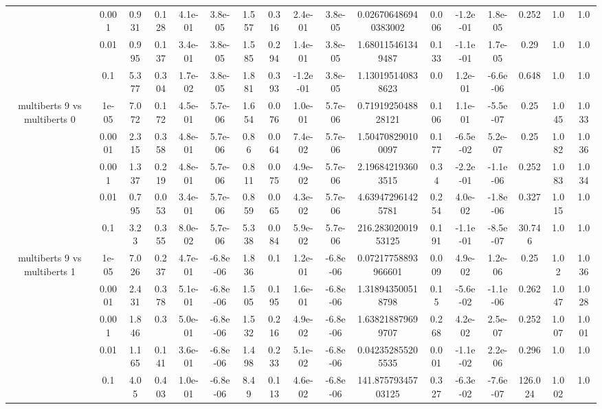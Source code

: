 \begin{tabular}{|c|c|c|c|c|c|c|c|c|c|c|c|c|c|c|c|c|}
 & 0.001 & 0.931 & 0.128 & 4.1e-01 & 3.8e-05 & 1.557 & 0.316 & 2.4e-01 & 3.8e-05 & 0.026706486940383002 & 0.006 & -1.2e-01 & 1.8e-05 & 0.252 & 1.0 & 1.0 \\
 & 0.01 & 0.995 & 0.137 & 3.4e-01 & 3.8e-05 & 1.585 & 0.294 & 1.4e-01 & 3.8e-05 & 1.680115461349487 & 0.133 & -1.1e-01 & 1.7e-05 & 0.29 & 1.0 & 1.0 \\
 & 0.1 & 5.377 & 0.304 & 1.7e-02 & 3.8e-05 & 1.881 & 0.393 & -1.2e-01 & 3.8e-05 & 1.130195140838623 & 0.0 & 1.2e-01 & -6.6e-06 & 0.648 & 1.0 & 1.0 \\
\hline
\multirow{5}{*}{multiberts 9 vs multiberts 0} & 1e-05 & 7.072 & 0.172 & 4.5e-01 & 5.7e-06 & 1.654 & 0.076 & 1.0e-01 & 5.7e-06 & 0.7191925048828121 & 0.106 & 1.1e-01 & -5.5e-07 & 0.25 & 1.045 & 1.033 \\
 & 0.0001 & 2.315 & 0.358 & 4.8e-01 & 5.7e-06 & 0.86 & 0.064 & 7.4e-02 & 5.7e-06 & 1.504708290100097 & 0.177 & -6.5e-02 & 5.2e-07 & 0.25 & 1.082 & 1.036 \\
 & 0.001 & 1.337 & 0.219 & 4.8e-01 & 5.7e-06 & 0.811 & 0.075 & 4.9e-02 & 5.7e-06 & 2.196842193603515 & 0.34 & -2.2e-01 & -1.1e-06 & 0.252 & 1.083 & 1.034 \\
 & 0.01 & 0.795 & 0.053 & 3.4e-01 & 5.7e-06 & 0.859 & 0.065 & 4.3e-02 & 5.7e-06 & 4.639472961425781 & 0.254 & 4.0e-02 & -1.8e-06 & 0.327 & 1.015 & 1.0 \\
 & 0.1 & 3.23 & 0.355 & 8.0e-02 & 5.7e-06 & 5.338 & 0.084 & 5.9e-02 & 5.7e-06 & 216.28302001953125 & 0.191 & -1.1e-01 & -8.5e-07 & 30.746 & 1.0 & 1.0 \\
\hline
\multirow{5}{*}{multiberts 9 vs multiberts 1} & 1e-05 & 7.026 & 0.237 & 4.7e-01 & -6.8e-06 & 1.836 & 0.1 & 1.2e-01 & -6.8e-06 & 0.07217758893966601 & 0.009 & 4.9e-02 & 1.2e-06 & 0.25 & 1.02 & 1.036 \\
 & 0.0001 & 2.431 & 0.378 & 5.1e-01 & -6.8e-06 & 1.505 & 0.195 & 1.6e-01 & -6.8e-06 & 1.318943500518798 & 0.15 & -5.6e-02 & -1.1e-06 & 0.262 & 1.047 & 1.028 \\
 & 0.001 & 1.846 & 0.3 & 5.0e-01 & -6.8e-06 & 1.532 & 0.216 & 4.9e-02 & -6.8e-06 & 1.638218879699707 & 0.268 & 4.2e-02 & 2.5e-07 & 0.252 & 1.007 & 1.001 \\
 & 0.01 & 1.165 & 0.141 & 3.6e-01 & -6.8e-06 & 1.498 & 0.233 & 5.1e-02 & -6.8e-06 & 0.042352855205535 & 0.001 & -1.1e-02 & 2.2e-06 & 0.296 & 1.0 & 1.0 \\
 & 0.1 & 4.05 & 0.403 & 1.0e-01 & -6.8e-06 & 8.49 & 0.113 & 4.6e-02 & -6.8e-06 & 141.87579345703125 & 0.327 & -6.3e-02 & -7.6e-07 & 126.024 & 1.002 & 1.0 \\

\end{tabular}
